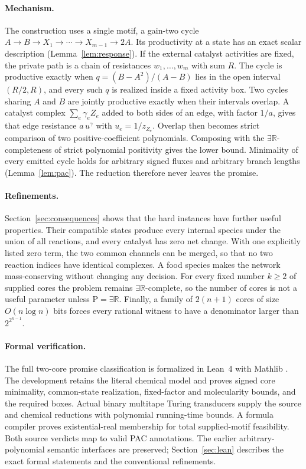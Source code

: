 \documentclass[11pt,a4paper]{article}
\theoremstyle{plain}
\theoremstyle{definition}
\theoremstyle{remark}
\newcommand{\ER}{\exists\mathbb{R}}
\begin{document}
\paragraph{Mechanism.}
The construction uses a single motif, a gain-two cycle $A\to B\to X_1\to\cdots\to X_{m-1}\to2A$. Its productivity at a state has an exact scalar description (Lemma~\ref{lem:response}). If the external catalyst activities are fixed, the private path is a chain of resistances $w_1,\ldots,w_m$ with sum $R$. The cycle is productive exactly when $q=(B-A^2)/(A-B)$ lies in the open interval $(R/2,R)$, and every such $q$ is realized inside a fixed activity box. Two cycles sharing $A$ and $B$ are jointly productive exactly when their intervals overlap. A catalyst complex $\sum_e\gamma_eZ_e$ added to both sides of an edge, with factor $1/a$, gives that edge resistance $a\,u^\gamma$ with $u_e=1/z_{Z_e}$. Overlap then becomes strict comparison of two positive-coefficient polynomials. Composing with the $\ER$-completeness of strict polynomial positivity \citep{schaefer2024} gives the lower bound. Minimality of every emitted cycle holds for arbitrary signed fluxes and arbitrary branch lengths (Lemma~\ref{lem:pac}). The reduction therefore never leaves the promise.

\paragraph{Refinements.}
Section~\ref{sec:consequences} shows that the hard instances have further useful properties. Their compatible states produce every internal species under the union of all reactions, and every catalyst has zero net change. With one explicitly listed zero term, the two common channels can be merged, so that no two reaction indices have identical complexes. A food species makes the network mass-conserving without changing any decision. For every fixed number $k\ge2$ of supplied cores the problem remains $\ER$-complete, so the number of cores is not a useful parameter unless $\mathrm P=\ER$. Finally, a family of $2(n+1)$ cores of size $O(n\log n)$ bits forces every rational witness to have a denominator larger than $2^{2^{n-1}}$.

\paragraph{Formal verification.}
The full two-core promise classification is formalized in Lean~4 with Mathlib \citep{demoura2021,mathlib2020}. The development retains the literal chemical model and proves signed core minimality, common-state realization, fixed-factor and molecularity bounds, and the required boxes. Actual binary multitape Turing transducers supply the source and chemical reductions with polynomial running-time bounds. A formula compiler proves existential-real membership for total supplied-motif feasibility. Both source verdicts map to valid PAC annotations. The earlier arbitrary-polynomial semantic interfaces are preserved; Section~\ref{sec:lean} describes the exact formal statements and the conventional refinements.
\end{document}
